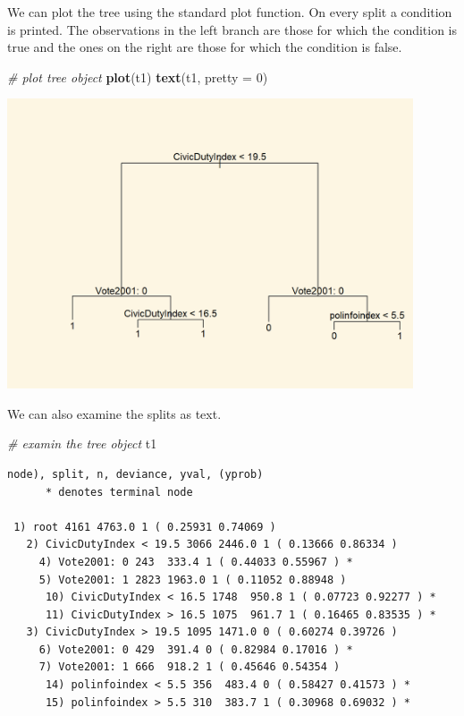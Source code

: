 \documentclass[]{article}
\newenvironment{Shaded}{\begin{snugshade}}{\end{snugshade}}
\newcommand{\CommentTok}[1]{\textcolor[rgb]{0.56,0.35,0.01}{\textit{#1}}}
\newcommand{\DataTypeTok}[1]{\textcolor[rgb]{0.13,0.29,0.53}{#1}}
\newcommand{\DecValTok}[1]{\textcolor[rgb]{0.00,0.00,0.81}{#1}}
\newcommand{\KeywordTok}[1]{\textcolor[rgb]{0.13,0.29,0.53}{\textbf{#1}}}
\newcommand{\NormalTok}[1]{#1}
\begin{document}
We can plot the tree using the standard plot function. On every split a condition is printed. The observations in the left branch are those for which the condition is true and the ones on the right are those for which the condition is false.

\begin{Shaded}
\begin{Highlighting}[]
\CommentTok{# plot tree object}
\KeywordTok{plot}\NormalTok{(t1)}
\KeywordTok{text}\NormalTok{(t1, }\DataTypeTok{pretty =} \DecValTok{0}\NormalTok{)}
\end{Highlighting}
\end{Shaded}

\includegraphics[width=0.9\textwidth,height=\textheight]{./img/unnamed-chunk-136-1.png}

We can also examine the splits as text.

\begin{Shaded}
\begin{Highlighting}[]
\CommentTok{# examin the tree object}
\NormalTok{t1}
\end{Highlighting}
\end{Shaded}

\begin{verbatim}
node), split, n, deviance, yval, (yprob)
      * denotes terminal node

 1) root 4161 4763.0 1 ( 0.25931 0.74069 )  
   2) CivicDutyIndex < 19.5 3066 2446.0 1 ( 0.13666 0.86334 )  
     4) Vote2001: 0 243  333.4 1 ( 0.44033 0.55967 ) *
     5) Vote2001: 1 2823 1963.0 1 ( 0.11052 0.88948 )  
      10) CivicDutyIndex < 16.5 1748  950.8 1 ( 0.07723 0.92277 ) *
      11) CivicDutyIndex > 16.5 1075  961.7 1 ( 0.16465 0.83535 ) *
   3) CivicDutyIndex > 19.5 1095 1471.0 0 ( 0.60274 0.39726 )  
     6) Vote2001: 0 429  391.4 0 ( 0.82984 0.17016 ) *
     7) Vote2001: 1 666  918.2 1 ( 0.45646 0.54354 )  
      14) polinfoindex < 5.5 356  483.4 0 ( 0.58427 0.41573 ) *
      15) polinfoindex > 5.5 310  383.7 1 ( 0.30968 0.69032 ) *
\end{verbatim}
\end{document}
